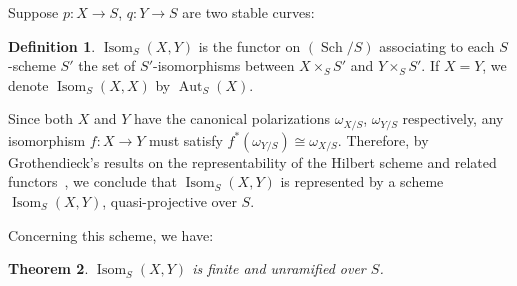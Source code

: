 \documentclass[10pt]{amsart}
\theoremstyle{plain}
\newtheorem{theorem}{Theorem}[section]
\theoremstyle{definition}
\newtheorem{definition}[theorem]{Definition}
\DeclareMathOperator{\Aut}{Aut}
\DeclareMathOperator{\Isom}{Isom}
\DeclareMathOperator{\Sch}{Sch}
\begin{document}
Suppose $p: X \to S$, $q: Y \to S$ are two stable curves:

\begin{definition}\label{def:1.10}
$\Isom_S(X,Y)$ is the functor on $(\Sch/S)$ associating to each $S$-scheme $S'$ the set of $S'$-isomorphisms between $X \times_S S'$ and $Y \times_S S'$. If $X = Y$, we denote $\Isom_S(X,X)$ by $\Aut_S(X)$.
\end{definition}

Since both $X$ and $Y$ have the canonical polarizations $\omega_{X/S}$, $\omega_{Y/S}$ respectively, any isomorphism $f: X \to Y$ must satisfy $f^*(\omega_{Y/S}) \cong \omega_{X/S}$. Therefore, by Grothendieck's results on the representability of the Hilbert scheme and related functors~\cite{Gr}, we conclude that $\Isom_S(X,Y)$ is represented by a scheme $\Isom_S(X,Y)$, quasi-projective over $S$.

Concerning this scheme, we have:

\begin{theorem}\label{thm:1.11}
$\Isom_S(X,Y)$ is finite and unramified over $S$.
\end{theorem}
\end{document}
